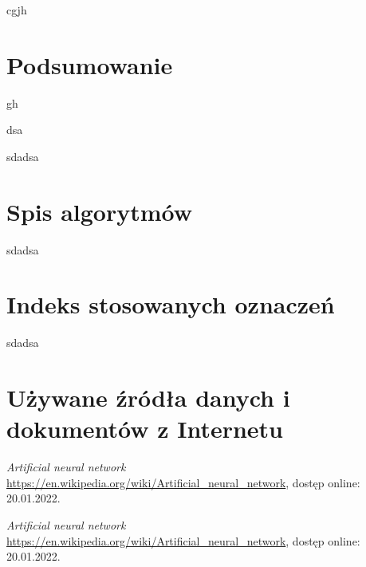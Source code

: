 \documentclass[wmii, inf, mgr]{uwmthesis}
\begin{document}
cgjh

\chapter{Podsumowanie}

gh


\listoffigures
dsa

\listoftables
sdadsa

\chapter{Spis algorytmów}
sdadsa

\chapter{Indeks stosowanych oznaczeń}
sdadsa

\chapter{Używane źródła danych i dokumentów z Internetu}
\textit{Artificial neural network}
\url{https://en.wikipedia.org/wiki/Artificial_neural_network}, dostęp online: 20.01.2022.


\textit{Artificial neural network}
 \url{https://en.wikipedia.org/wiki/Artificial_neural_network}, dostęp online: 20.01.2022.
\end{document}
